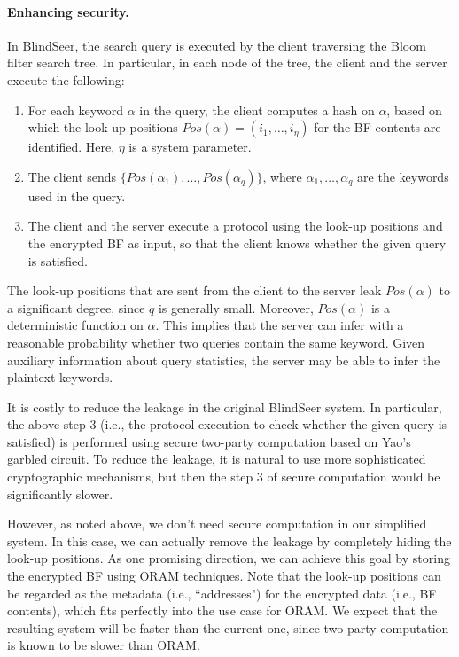 \paragraph{Enhancing security.}
In BlindSeer, the search query is executed by the client traversing the Bloom filter
search tree. In particular, in each node of the tree, the client and the server
execute the following:
\begin{enumerate}\setlength\itemsep{0em}
\item For each keyword $\alpha$ in the query, the client computes a hash on
  $\alpha$, based on which the look-up positions $Pos(\alpha) = (i_1, \ldots,
    i_\eta)$ for the BF contents are identified. Here, $\eta$ is a system
    parameter. 

\item The client sends $\{Pos(\alpha_1), \ldots, Pos(\alpha_q)\}$,
  where $\alpha_1,\ldots,\alpha_q$ are the keywords used in the query.

\item The client and the server execute a protocol using the look-up positions
  and the encrypted BF as input, so that the client knows whether the given
query is satisfied. 
\end{enumerate}

The look-up positions that are sent from the client to the server leak
$Pos(\alpha)$ to a significant degree, since $q$ is generally small.
Moreover, $Pos(\alpha)$ is a deterministic function on $\alpha$.
This implies that the server can infer with a reasonable probability whether
two queries contain the same keyword.
Given  auxiliary information about query statistics, the
server may be able to infer the plaintext keywords.


It is costly to reduce the leakage in the original BlindSeer system. In
particular, the above step 3 (i.e., the protocol execution to check whether the
given query is satisfied) is performed using secure two-party computation based
on Yao's garbled circuit. To reduce the leakage, it is natural to use more
sophisticated cryptographic mechanisms, but then the step 3 of secure
computation would be significantly slower. 

However, as noted above, we don't need secure computation in our simplified
system. In this case, we can actually remove the leakage by completely hiding
the look-up positions. As one promising direction, we can achieve this goal by
storing the encrypted BF using ORAM techniques. Note that the look-up positions
can be regarded as the metadata (i.e., ``addresses") for the encrypted data
(i.e., BF contents), which fits perfectly into the use case for ORAM.
%
We expect that the resulting system will be faster than the current one, since
two-party computation is known to be slower than ORAM. 
